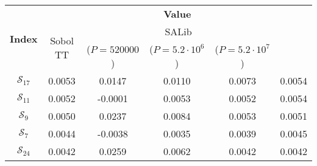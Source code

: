 
    \begin{tabular}{|c|c|cccc|}
        \hline
        \multicolumn{1}{|c|}{\multirow{3}{*}{\textbf{Index}}} & \multicolumn{5}{c|}{\textbf{Value}} \\ \cline{ 2-6 }
        \multicolumn{1}{|c|}{} & \multicolumn{1}{c|}{\multirow{2}{*}{Sobol TT}} & \multicolumn{3}{c|}{SALib} & \multicolumn{1}{c|}{{\multirow{ 2 }{*}{ Analytical }}} \\ \cline{ 3-5 }
        \multicolumn{1}{|c|}{} & \multicolumn{1}{c|}{} & \multicolumn{1}{c|}{($P= 520000$)} & \multicolumn{1}{c|}{($P= 5.2 \cdot 10^6$)} & \multicolumn{1}{c|}{($P= 5.2 \cdot 10^7$)} & \multicolumn{1}{c|}{} \\ \hline\hline
    
            $\mathcal{S}_{ 17 }$ & 0.0053 & 0.0147 & 0.0110 & 0.0073 & 0.0054 \\

            $\mathcal{S}_{ 11 }$ & 0.0052 & -0.0001 & 0.0053 & 0.0052 & 0.0054 \\

            $\mathcal{S}_{ 9 }$ & 0.0050 & 0.0237 & 0.0084 & 0.0053 & 0.0051 \\

            $\mathcal{S}_{ 7 }$ & 0.0044 & -0.0038 & 0.0035 & 0.0039 & 0.0045 \\

            $\mathcal{S}_{ 24 }$ & 0.0042 & 0.0259 & 0.0062 & 0.0042 & 0.0042 \\

        \hline
        \end{tabular}